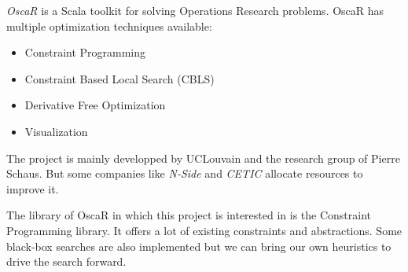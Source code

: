\documentclass[../../thesis.tex]{subfiles}
\begin{document}
\emph{OscaR} \cite{oscar} is a Scala toolkit for solving Operations Research problems. 
OscaR has multiple optimization techniques available:

\begin{itemize}
  \item Constraint Programming
  \item Constraint Based Local Search (CBLS)
  \item Derivative Free Optimization
  \item Visualization
\end{itemize}

The project is mainly developped by UCLouvain and the research group of Pierre Schaus. But some companies like \emph{N-Side} and \emph{CETIC} allocate resources to improve it.

The library of OscaR in which this project is interested in is the Constraint Programming library. It offers a lot of existing constraints and abstractions. Some black-box searches are also 
implemented but we can bring our own heuristics to drive the search forward.
\end{document}

